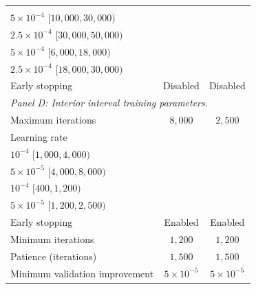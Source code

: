 \begin{table}[!ht]
\begin{tabular}{lcc}
        \makecell{\scriptsize $10^{-3}$ $[0,10{,}000)$\\ \scriptsize $5\times 10^{-4}$ $[10{,}000,30{,}000)$ \\ \scriptsize $2.5\times 10^{-4}$ $[30{,}000,50{,}000)$} & \makecell{\scriptsize $10^{-3}$ $[0,6{,}000)$\\ \scriptsize $5\times 10^{-4}$ $[6{,}000,18{,}000)$ \\ \scriptsize $2.5\times 10^{-4}$ $[18{,}000,30{,}000)$} \\
        Early stopping & Disabled & Disabled \\
        \midrule
        \multicolumn{3}{l}{\it Panel D: Interior interval training parameters.}\\
        Maximum iterations & $8{,}000$ & $2{,}500$ \\
        Learning rate & 
        \makecell{\scriptsize $2\times10^{-4}$ $[0,1{,}000)$\\ \scriptsize $10^{-4}$ $[1{,}000,4{,}000)$ \\ \scriptsize $5\times 10^{-5}$ $[4{,}000,8{,}000)$} & \makecell{\scriptsize $2\times10^{-4}$ $[0,400)$\\ \scriptsize $10^{-4}$ $[400,1{,}200)$ \\ \scriptsize $5\times 10^{-5}$ $[1{,}200,2{,}500)$} \\
        Early stopping & Enabled & Enabled \\
        Minimum iterations & $1{,}200$ & $1{,}200$ \\
        Patience (iterations) & $1{,}500$ & $1{,}500$ \\
        Minimum validation improvement & $5\times10^{-5}$ & $5\times10^{-5}$ \\
        \bottomrule
    \end{tabular}
\end{table}
